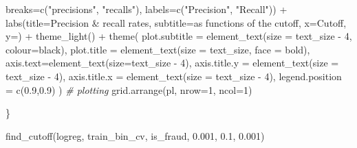 \documentclass[
]{report}
\newenvironment{Shaded}{\begin{snugshade}}{\end{snugshade}}
\newcommand{\AttributeTok}[1]{\textcolor[rgb]{0.77,0.63,0.00}{#1}}
\newcommand{\CommentTok}[1]{\textcolor[rgb]{0.56,0.35,0.01}{\textit{#1}}}
\newcommand{\DecValTok}[1]{\textcolor[rgb]{0.00,0.00,0.81}{#1}}
\newcommand{\FloatTok}[1]{\textcolor[rgb]{0.00,0.00,0.81}{#1}}
\newcommand{\FunctionTok}[1]{\textcolor[rgb]{0.00,0.00,0.00}{#1}}
\newcommand{\NormalTok}[1]{#1}
\newcommand{\SpecialCharTok}[1]{\textcolor[rgb]{0.00,0.00,0.00}{#1}}
\newcommand{\StringTok}[1]{\textcolor[rgb]{0.31,0.60,0.02}{#1}}
\begin{document}
\begin{Shaded}
\begin{Highlighting}[]
                          \AttributeTok{breaks=}\FunctionTok{c}\NormalTok{(}\StringTok{"precisions"}\NormalTok{, }\StringTok{"recalls"}\NormalTok{),}
                          \AttributeTok{labels=}\FunctionTok{c}\NormalTok{(}\StringTok{"Precision"}\NormalTok{, }\StringTok{"Recall"}\NormalTok{)) }\SpecialCharTok{+}
    \FunctionTok{labs}\NormalTok{(}\AttributeTok{title=}\StringTok{\textquotesingle{}Precision \& recall rates\textquotesingle{}}\NormalTok{,}
         \AttributeTok{subtitle=}\StringTok{\textquotesingle{}as functions of the cutoff\textquotesingle{}}\NormalTok{,}
         \AttributeTok{x=}\StringTok{\textquotesingle{}Cutoff\textquotesingle{}}\NormalTok{, }\AttributeTok{y=}\StringTok{\textquotesingle{}\textquotesingle{}}\NormalTok{) }\SpecialCharTok{+}
   \FunctionTok{theme\_light}\NormalTok{() }\SpecialCharTok{+}
    \FunctionTok{theme}\NormalTok{(}
      \AttributeTok{plot.subtitle =} \FunctionTok{element\_text}\NormalTok{(}\AttributeTok{size =}\NormalTok{ text\_size }\SpecialCharTok{{-}} \DecValTok{4}\NormalTok{, }\AttributeTok{colour=}\StringTok{\textquotesingle{}black\textquotesingle{}}\NormalTok{),}
      \AttributeTok{plot.title =} \FunctionTok{element\_text}\NormalTok{(}\AttributeTok{size =}\NormalTok{ text\_size, }\AttributeTok{face =} \StringTok{\textquotesingle{}bold\textquotesingle{}}\NormalTok{),}
      \AttributeTok{axis.text=}\FunctionTok{element\_text}\NormalTok{(}\AttributeTok{size=}\NormalTok{text\_size }\SpecialCharTok{{-}} \DecValTok{4}\NormalTok{), }
      \AttributeTok{axis.title.y =} \FunctionTok{element\_text}\NormalTok{(}\AttributeTok{size =}\NormalTok{ text\_size }\SpecialCharTok{{-}} \DecValTok{4}\NormalTok{), }
      \AttributeTok{axis.title.x =} \FunctionTok{element\_text}\NormalTok{(}\AttributeTok{size =}\NormalTok{ text\_size }\SpecialCharTok{{-}} \DecValTok{4}\NormalTok{),}
      \AttributeTok{legend.position =} \FunctionTok{c}\NormalTok{(}\FloatTok{0.9}\NormalTok{,}\FloatTok{0.9}\NormalTok{)}
\NormalTok{    )}
  \CommentTok{\# plotting}
  \FunctionTok{grid.arrange}\NormalTok{(pl, }\AttributeTok{nrow=}\DecValTok{1}\NormalTok{, }\AttributeTok{ncol=}\DecValTok{1}\NormalTok{)}
  
\NormalTok{\}}
\end{Highlighting}
\end{Shaded}

\begin{Shaded}
\begin{Highlighting}[]
\FunctionTok{find\_cutoff}\NormalTok{(logreg, train\_bin\_cv, }\StringTok{\textquotesingle{}is\_fraud\textquotesingle{}}\NormalTok{, }\FloatTok{0.001}\NormalTok{, }\FloatTok{0.1}\NormalTok{, }\FloatTok{0.001}\NormalTok{)}
\end{Highlighting}
\end{Shaded}
\end{document}
